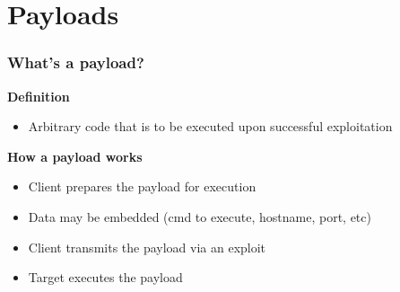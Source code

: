 \documentclass{beamer}
\newenvironment{sitemize}{\vspace{1mm}\begin{itemize}\itemsep 4pt\small}{\end{itemize}}
\begin{document}
\section{Payloads}

\begin{frame}[t]
    \frametitle{What's a payload?}

    \textbf{Definition}
    \begin{sitemize}
        \item Arbitrary code that is to be executed upon successful
        exploitation
    \end{sitemize}

    \pause
    \textbf{How a payload works}
    \begin{sitemize}
        \item Client prepares the payload for execution
    \pause
    \item Data may be embedded  (cmd to execute, hostname, port, etc)
    \pause
        \item Client transmits the payload via an exploit
    \pause
        \item Target executes the payload
    \end{sitemize}
\end{frame}
\end{document}
